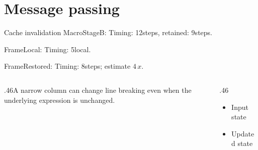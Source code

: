 \documentclass[9pt,aspectratio=169]{beamer}
\newcommand{\fuzzlayerA}[1]{\textrm{#1}}
\newcommand{\fuzzlayerB}[1]{\fuzzlayerA{#1}}
\newcommand{\fuzzlayerC}[1]{\fuzzlayerB{#1}}
\newcommand{\fuzzterm}[1]{\fuzzlayerC{#1}}
\newcommand{\fuzzpair}[2]{\fuzzterm{#1}: #2}
\newcommand{\fuzzunit}{steps}
\let\fuzzoriginalunit\fuzzunit
\newcommand{\fuzzcoefficient}{4}
\newcommand{\fuzzscale}[2][\fuzzcoefficient]{#1\,#2}
\begin{document}
\section{Message passing}
\begin{frame}[t]{Cache invalidation}
\fuzzpair{MacroStageB}{Timing: 12\fuzzunit, retained: 9\fuzzoriginalunit.}\par
{\renewcommand{\fuzzunit}{local}\fuzzpair{FrameLocal}{Timing: 5\fuzzunit.}\par}
\fuzzpair{FrameRestored}{Timing: 8\fuzzunit; estimate $\fuzzscale{x}$.}\par
\begin{columns}[T]\begin{column}{.46\textwidth}A narrow column can change line breaking even when the underlying expression is unchanged.\end{column}\begin{column}{.46\textwidth}\begin{itemize}\item Input state\item Updated state\end{itemize}\end{column}\end{columns}
\end{frame}
\end{document}
